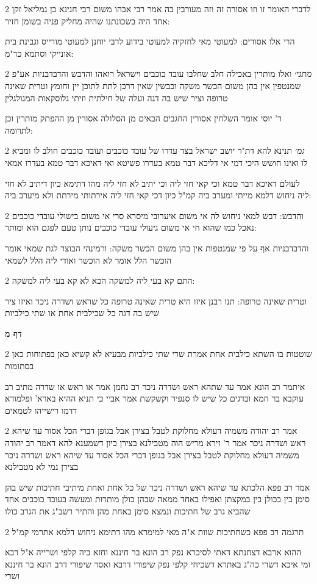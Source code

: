 \documentclass[12pt, openany]{book}
\newcommand{\sethebfont}{
\fontsize{10.5pt}{21.0pt} \selectfont
}
\newcommand{\twocol}[1]{
	{\sethebfont \begin{multicols}{2}
			#1
	\end{multicols}}	
}
\newcommand{\sectname}{}
\newcommand{\newsection}[1]{
	\addcontentsline{toc}{section}{#1}
	\renewcommand{\sectname}{#1}	
	\vspace{-\baselineskip}
	\begin{center}
		\textbf{%
\fontsize{16pt}{16pt}\selectfont
			#1}
	\end{center}
	\vspace{-\baselineskip}
	\nopagebreak
}
\begin{document}
\twocol{לדברי האומר זו וזו אסורה זה וזה מעורבין בה אמר רבי אבהו משום רבי חנינא בן גמליאל זקן אחד היה בשכונתנו שהיה מחליק פניה בשומן חזיר:
\par הרי אלו אסורים: למעוטי מאי לחזקיה למעוטי בידוע לרבי יוחנן למעוטי מורייס וגבינת בית אונייקי וסתמא כר"מ:}
\twocol{{\large\emph{מתני׳}} ואלו מותרין באכילה חלב שחלבו עובד כוכבים וישראל רואהו והדבש והדבדבניות אע"פ שמנטפין אין בהן משום הכשר משקה וכבשין שאין דרכן לתת לתוכן יין וחומץ וטרית שאינה טרופה וציר שיש בה דגה ועלה של חילתית וזיתי גלוסקאות המגולגלין
\par ר' יוסי אומר השלחין אסורין החגבים הבאים מן הסלולה אסורין מן ההפתק מותרין וכן לתרומה:}
\twocol{{\large\emph{גמ׳}} תנינא להא דת"ר יושב ישראל בצד עדרו של עובד כוכבים ועובד כוכבים חולב לו ומביא לו ואינו חושש היכי דמי אי דליכא דבר טמא בעדרו פשיטא ואי דאיכא דבר טמא בעדרו אמאי
\par לעולם דאיכא דבר טמא וכי קאי חזי ליה וכי יתיב לא חזי ליה מהו דתימא כיון דיתיב לא חזי ליה ניחוש דלמא מייתי ומערב ביה קמ"ל כיון דכי קאי חזי ליה אירתותי מירתת ולא מיערב ביה:}
\twocol{והדבש: דבש למאי ניחוש לה אי משום איערובי מיסרא סרי אי משום בישולי עובדי כוכבים נאכל כמו שהוא חי אי משום גיעולי עובדי כוכבים נותן טעם לפגם הוא ומותר:
\par והדבדבניות אף על פי שמנטפות אין בהן משום הכשר משקה: ורמינהי הבוצר לגת שמאי אומר הוכשר הלל אומר לא הוכשר ואודי ליה הלל לשמאי}
\twocol{התם קא בעי ליה למשקה הכא לא קא בעי ליה למשקה:
\par וטרית שאינה טרופה: תנו רבנן איזו היא טרית שאינה טרופה כל שראש ושדרה ניכר ואיזו ציר שיש בה דגה כל שכילבית אחת או שתי כילביות}
\newsection{דף מ}
\twocol{שוטטות בו השתא כילבית אחת אמרת שרי שתי כילביות מבעיא לא קשיא כאן בפתוחות כאן בסתומות
\par איתמר רב הונא אמר עד שתהא ראש ושדרה ניכר רב נחמן אמר או ראש או שדרה מתיב רב עוקבא בר חמא ובדגים כל שיש לו סנפיר וקשקשת אמר אביי כי תניא ההיא בארא' ופלמודא דדמו רישייהו לטמאים}
\twocol{אמר רב יהודה משמיה דעולא מחלוקת לטבל בצירן אבל בגופן דברי הכל אסור עד שיהא ראש ושדרה ניכר אמר ר' זירא מריש הוה מטבילנא בצירן כיון דשמענא להא דאמר רב יהודה משמיה דעולא מחלוקת לטבל בצירן אבל בגופן דברי הכל אסור עד שיהא ראש ושדרה ניכר בצירן נמי לא מטבילנא
\par אמר רב פפא הלכתא עד שיהא ראש ושדרה ניכר של כל אחת ואחת מיתיבי חתיכות שיש בהן סימן בין בכולן בין במקצתן ואפילו באחד ממאה שבהן כולן מותרות ומעשה בעובד כוכבים אחד שהביא גרב של חתיכות ונמצא סימן באחת מהן והתיר רשב"ג את הגרב כולו}
\twocol{תרגמה רב פפא כשחתיכות שוות א"ה מאי למימרא מהו דתימא ניחוש דלמא אתרמי קמ"ל
\par ההוא ארבא דצחנתא דאתי לסיכרא נפק רב הונא בר חיננא וחזא ביה קלפי ושרייה א"ל רבא ומי איכא דשרי כה"ג באתרא דשכיחי קלפי נפק שיפורי דרבא ואסר שיפורי דרב הונא בר חיננא ושרי}
\end{document}
